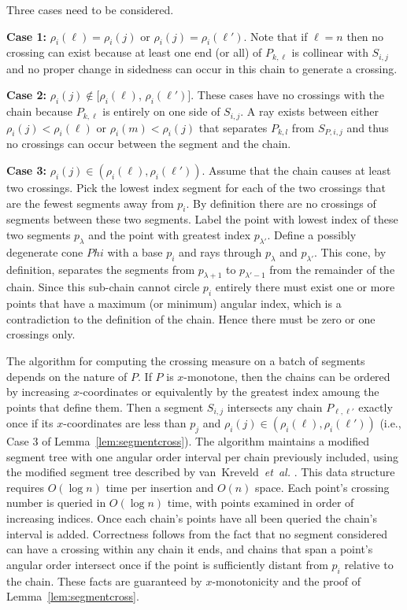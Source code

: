 \documentclass{article}
\def\QED{\ensuremath{{\square}}}
\def\markatright#1{\leavevmode\unskip\nobreak\quad\hspace*{\fill}{#1}}
\newenvironment{proof}
  {\begin{trivlist}\item[\hskip\labelsep{\bf Proof.}]}
  {\markatright{\QED}\end{trivlist}}
\begin{document}
\begin{proof} Three cases need to be considered.
	
{\bf Case 1:} $\rho_i(\ell)=\rho_i(j)$ or $\rho_i(j)=\rho_i(\ell')$. Note
that if $\ell=n$ then no crossing can exist because at least one end (or all)
of $P_{k,\ell}$ is collinear with $S_{i,j}$ and no proper change in sidedness
can occur in this chain to generate a crossing.
		
{\bf Case 2:} $\rho_i(j) \notin [\rho_i(\ell)$, $\rho_i(\ell')]$.  These
cases have no crossings with the chain because $P_{k,\ell}$ is entirely on
one side of $S_{i,j}$.  A ray exists
between either $\rho_i(j)<\rho_i(\ell)$ or $\rho_i(m)<\rho_i(j)$ that separates
$P_{k,l}$ from $S_ {P,i,j}$ and thus no crossings can occur between the
segment and the chain.
		
{\bf Case 3:} $\rho_i(j) \in (\rho_i(\ell),\rho_i(\ell'))$.
Assume that the chain causes at least two crossings.  Pick the lowest index segment for each of the two crossings that are the fewest segments away from $p_i$.
By definition there are no crossings of segments between these two segments.
Label the point with lowest index of these two segments $p_{\lambda}$ and
the point with greatest index $p_{\lambda'}$.  Define a possibly degenerate cone $Phi$ with a base $p_i$ and rays through 
$p_{\lambda}$ and $p_{\lambda'}$.  This cone, by definition, separates the segments from $p_{\lambda + 1}$ to $p_{\lambda'-1}$ from the remainder of the chain.  Since this sub-chain cannot circle $p_i$ entirely there must exist one or more points that have a maximum (or minimum) angular index, which is a contradiction to the definition of the chain.  Hence there must be zero or one crossings only.\end{proof}
	
The algorithm for computing the crossing measure on a batch of segments
depends on the nature of $P$.  If $P$ is
$x$-monotone, then the chains can be ordered by increasing $x$-coordinates or
equivalently by the greatest index amoung the points that define them.  Then
a segment $S_{i,j}$ intersects any chain $P_{\ell,\ell'}$ exactly once if
its $x$-coordinates are less than $p_j$ and $\rho_i(j) \in
\left(\rho_i(\ell),\rho_i(\ell')\right)$ (i.e., Case 3 of
Lemma~\ref{lem:segmentcross}).  The algorithm maintains a modified segment
tree with one angular order interval per chain previously included, using
the modified segment tree described by van~Kreveld~\emph{et~al.}
\cite[p.~237]{berg:2008fk}.  This data structure requires $O(\log n)$ time
per insertion and $O(n)$ space.  Each point's crossing number is queried in
$O(\log n)$ time, with points examined in order of increasing indices. 
Once each chain's points have all been queried the chain's interval is
added.  Correctness follows from the fact that no segment considered
can have a crossing within any chain it ends, and chains that span a
point's angular order intersect once if the point is sufficiently distant
from $p_i$ relative to the chain.  These facts are guaranteed by
$x$-monotonicity and the proof of Lemma~\ref{lem:segmentcross}.
	
\end{document}
